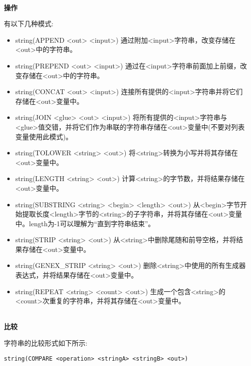 \hspace*{\fill} \\ %
\noindent
\textbf{操作}

有以下几种模式:

\begin{itemize}
\item 
string(APPEND <out> <input>) 通过附加<input>字符串，改变存储在<out>中的字符串。

\item 
string(PREPEND <out> <input>) 通过在<input>字符串前面加上前缀，改变存储在<out>中的字符串。

\item 
string(CONCAT <out> <input>) 连接所有提供的<input>字符串并将它们存储在<out>变量中。

\item 
string(JOIN <glue> <out> <input>) 将所有提供的<input>字符串与<glue>值交错，并将它们作为串联的字符串存储在<out>变量中(不要对列表变量使用此模式)。

\item
string(TOLOWER <string> <out>) 将<string>转换为小写并将其存储在<out>变量中。

\item
string(LENGTH <string> <out>) 计算<string>的字节数，并将结果存储在<out>变量中。

\item
string(SUBSTRING <string> <begin> <length> <out>) 从<begin>字节开始提取长度<length>字节的<string>的子字符串，并将其存储在<out>变量中。length为-1可以理解为“直到字符串结束”。

\item
string(STRIP <string> <out>) 从<string>中删除尾随和前导空格，并将结果存储在<out>变量中。

\item 
string(GENEX\_STRIP <string> <out>) 删除<string>中使用的所有生成器表达式，并将结果存储在<out>变量中。

\item 
string(REPEAT <string> <count> <out>) 生成一个包含<string>的<count>次重复的字符串，并将其存储在<out>变量中。
\end{itemize}


\hspace*{\fill} \\ %
\noindent
\textbf{比较}

字符串的比较形式如下所示:

\begin{lstlisting}[style=styleCMake]
string(COMPARE <operation> <stringA> <stringB> <out>)
\end{lstlisting}

